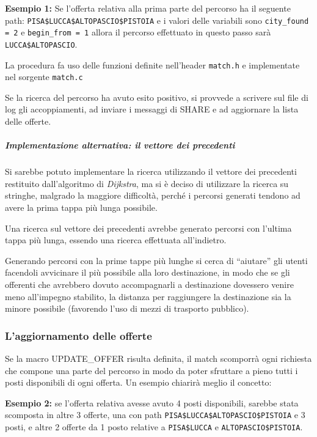 \documentclass[a4paper,10pt]{article}
\begin{document}
\begin{small}
\textbf{Esempio 1:} Se l'offerta relativa alla prima parte del percorso ha il seguente path: \texttt{PISA\$LUCCA\$ALTOPASCIO\$PISTOIA} e i valori delle variabili sono \texttt{city\_found = 2} e \texttt{begin\_from = 1} allora il percorso effettuato in questo passo sar\`a \texttt{LUCCA\$ALTOPASCIO}.
\end{small}

\medskip 

La procedura fa uso delle funzioni definite nell'header \texttt{match.h} e implementate nel sorgente \texttt{match.c}

Se la ricerca del percorso ha avuto esito positivo, si provvede a scrivere sul file di log gli accoppiamenti, ad inviare i messaggi di SHARE e ad aggiornare la lista delle offerte.

\subparagraph{Implementazione alternativa: il vettore dei precedenti}
\begin{small}
Si sarebbe potuto implementare la ricerca utilizzando il vettore dei precedenti restituito dall'algoritmo di \textit{Dijkstra}, ma si \`e deciso di utilizzare la ricerca su stringhe, malgrado la maggiore difficolt\`a, perch\'e i percorsi generati tendono ad avere la prima tappa pi\`u lunga possibile.

Una ricerca sul vettore dei precedenti avrebbe generato percorsi con l'ultima tappa pi\`u lunga, essendo una ricerca effettuata all'indietro.

Generando percorsi con la prime tappe pi\`u lunghe si cerca di ``aiutare'' gli utenti facendoli avvicinare il pi\`u possibile alla loro destinazione, in modo che se gli offerenti che avrebbero dovuto accompagnarli a destinazione dovessero venire meno all'impegno stabilito, la distanza per raggiungere la destinazione sia la minore possibile (favorendo l'uso di mezzi di trasporto pubblico).
\end{small}

\subsubsection{L'aggiornamento delle offerte}

Se la macro UPDATE\_OFFER risulta definita, il match scomporr\`a ogni richiesta che compone una parte del percorso in modo da poter sfruttare a pieno tutti i posti disponibili di ogni offerta. Un esempio chiarir\`a meglio il concetto:

\begin{small}
\textbf{Esempio 2:} se l'offerta relativa avesse avuto 4 posti disponibili, sarebbe stata scomposta in altre 3 offerte, una con path \texttt{PISA\$LUCCA\$ALTOPASCIO\$PISTOIA} e 3 posti, e altre 2 offerte da 1 posto relative a \texttt{PISA\$LUCCA} e \texttt{ALTOPASCIO\$PISTOIA}.
\end{small}
\end{document}

